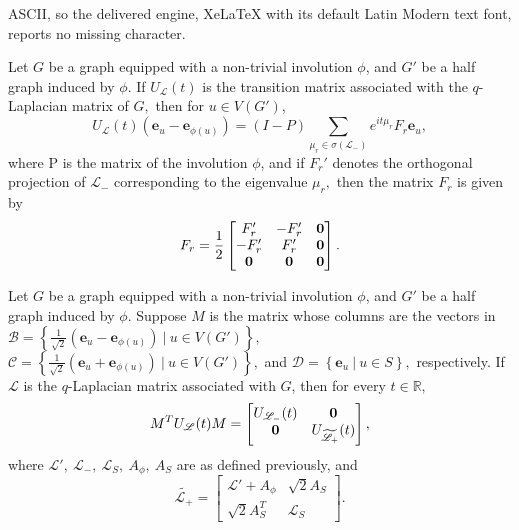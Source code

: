 \documentclass[10pt,a4paper]{amsart}
\def \e {{\mathbf e}}
\def \o {{\bf 0}}
\newcommand{\cb}[1]{\left\lbrace #1\right\rbrace}
\newcommand{\ob}[1]{\left(#1\right)}
\begin{document}
ASCII, so the delivered engine, XeLaTeX with its default Latin Modern text font, reports no missing character.
 \begin{lem}\label{L2}
 Let $G$ be a graph equipped with a non-trivial involution $\phi$, and $G'$ be a half graph induced by $\phi$. If $U_\mathscr{L}(t)$ is the transition matrix associated with the $q$-Laplacian matrix of $G,$ then for $u \in V(G')$,
 \begin{equation}\label{E3}
 U_\mathscr{L}(t)\ob{\e_u-\e_{\phi(u)}}=(I-P)\sum_{\mu_r \in \sigma(\mathscr{L}_-)}e^{it\mu_r}F_r\e_u,
 \end{equation}
 where P is the matrix of the involution $\phi$, and if $F_r'$ denotes the orthogonal projection of $\mathscr{L}_-$ corresponding to the eigenvalue $\mu_r,$ then the matrix $F_r$ is given by
 $$F_r=\frac{1}{2}\begin{bmatrix}
 F_r'&-F_r'&\o\\
 -F_r'& F_r'& \o\\
 \o& \o &\o
 \end{bmatrix}.$$
 \end{lem}

\begin{thm}\label{T2}
Let $G$ be a graph equipped with a non-trivial involution $\phi$, and $G'$ be a half graph induced by $\phi$. Suppose $M$ is the matrix whose columns are the vectors in $\mathcal{B}= \cb{\frac{1}{\sqrt{2} }\ob{\e_u-\e_{\phi(u)} }~|~  u \in V(G')},$ $\mathcal{C}=\cb{\frac{1}{\sqrt{2} }\ob{\e_u+\e_{\phi(u)} }~|~ u \in V(G')},$ and $\mathcal{D}=\cb{\e_u~|~ u \in S},$ respectively. If $\mathscr{L}$ is the $q$-Laplacian matrix associated with $G$, then for every $t \in \mathbb{R},$
\[M^T U_\mathscr{L}(t) M= \begin{bmatrix}	U_{\mathscr{L}_-}(t) & \o\\	\o & U_{\widetilde{\mathscr{L}_+}}(t)
\end{bmatrix},\]
where $\mathscr{L}',~\mathscr{L}_{-},~\mathscr{L}_{S}, ~A_\phi, ~A_S$ are as defined previously, and
\[\widetilde{\mathscr{L}_+}=\begin{bmatrix}	\mathscr{L}'+A_\phi&\sqrt{2} A_S\\
\sqrt{2}A_S^T & \mathscr{L}_S
\end{bmatrix}.\]
\end{thm}
\end{document}
